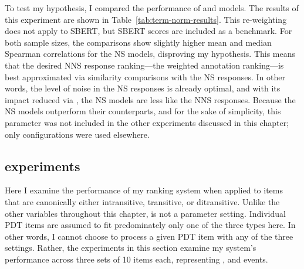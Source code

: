 To test my hypothesis, I compared the performance of  and  models. 
The results of this experiment are shown in Table~\ref{tab:term-norm-results}. This re-weighting does not apply to SBERT, but SBERT scores are included as a benchmark. For both sample sizes, the comparisons show slightly higher mean and median Spearman correlations for the  NS models, disproving my hypothesis. This means that the desired NNS response ranking---the weighted annotation ranking---is best approximated via similarity comparisons with the  NS responses. In other words, the level of noise in the NS responses is already optimal, and with its impact reduced via , the NS models are less like the NNS responses. Because the  NS models outperform their  counterparts, and for the sake of simplicity, this parameter was not included in the other experiments discussed in this chapter; only  configurations were used elsewhere.

\subsection{ experiments}
\label{sec:exp-transitivity}
Here I examine the performance of my ranking system when applied to items that are canonically either intransitive, transitive, or ditransitive. Unlike the other variables throughout this chapter,  is not a parameter setting. Individual PDT items are assumed to fit predominately only one of the three types here. In other words, I cannot choose to process a given PDT item with any of the three  settings. Rather, the experiments in this section examine my system's performance across three sets of 10 items each, representing ,  and  events.


